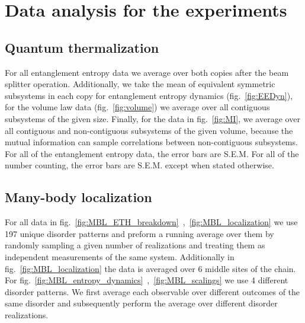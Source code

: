 \chapter{Data analysis for the experiments}
\label{AppendixB}

\section{Quantum thermalization}
For all entanglement entropy data we average over both copies after the beam splitter operation. Additionally, we take the mean of equivalent symmetric subsystems in each copy for entanglement entropy dynamics (fig.~\ref{fig:EEDyn}), for the volume law data (fig.~\ref{fig:volume}) we average over all contiguous subsystems of the given size. Finally, for the data in fig.~\ref{fig:MI}, we average over all contiguous and non-contiguous subsystems of the given volume, because the mutual information can sample correlations between non-contiguous subsystems.  For all of the entanglement entropy data, the error bars are S.E.M. For all of the number counting, the error bars are S.E.M. except when stated otherwise.

\section{Many-body localization}
For all data in fig.~\ref{fig:MBL_ETH_breakdown}~,~\ref{fig:MBL_localization} we use 197 unique disorder patterns and preform a running average over them by randomly sampling a given number of realizations and treating them as independent measurements of the same system. Additionally in fig.~\ref{fig:MBL_localization} the data is averaged over 6 middle sites of the chain. For fig.~\ref{fig:MBL_entropy_dynamics}~,~\ref{fig:MBL_scalings} we use 4 different disorder patterns. We first average each observable over different outcomes of the same disorder and subsequently perform the average over different disorder realizations. 

